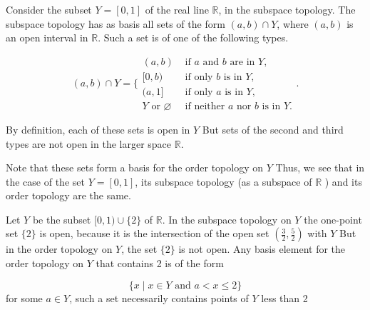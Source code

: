 \begin{centeredblock}
\begin{example}
\label{ex:\thesection.\theexample}
 Consider the subset \(Y = [ {0,1}]\) of the real line \(\mathbb{R}\), in the subspace topology. The subspace topology has as basis all sets of the form \(( {a,b}) \cap Y\), where \((a, b)\) is an open interval in \(\mathbb{R}\). Such a set is of one of the following types.

 \[
 ( {a,b}) \cap Y = \{ \begin{array}{ll} ( {a,b}) & \text{ if }a\text{ and }b\text{ are in }Y, \\ \lbrack 0,b) & \text{ if only }b\text{ is in }Y, \\ ( {a,1}] & \text{ if only }a\text{ is in }Y, \\ Y\text{ or }\varnothing & \text{ if neither }a\text{ nor }b\text{ is in }Y. \end{array}.
 \]

 By definition, each of these sets is open in \(Y\) But sets of the second and third types are not open in the larger space \(\mathbb{R}\).

 Note that these sets form a basis for the order topology on \(Y\) Thus, we see that in the case of the set \(Y = [ {0,1}]\), its subspace topology (as a subspace of \(\mathbb{R}\) ) and its order topology are the same.
\end{example}
\end{centeredblock}

\begin{centeredblock}
\begin{example}
\label{ex:\thesection.\theexample}
 Let \(Y\) be the subset \(\lbrack 0,1) \cup \{ 2\}\) of \(\mathbb{R}\). In the subspace topology on \(Y\) the one-point set \(\{ 2\}\) is open, because it is the intersection of the open set \(( {\frac{3}{2},\frac{5}{2}})\) with \(Y\) But in the order topology on \(Y\), the set \(\{ 2\}\) is not open. Any basis element for the order topology on \(Y\) that contains 2 is of the form

 \[
 \{ x \mid x \in Y\text{ and }a < x \leq 2\}
 \]
 for some \(a \in Y\), such a set necessarily contains points of \(Y\) less than 2
\end{example}
\end{centeredblock}

